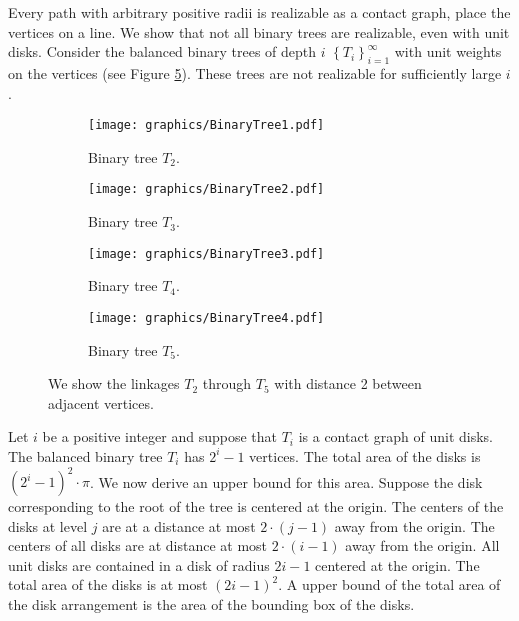 \documentclass[10pt]{CSUNthesis}
\theoremstyle{plain}%
\theoremstyle{definition}
\theoremstyle{remark}
\begin{document}
Every path with arbitrary positive radii is realizable as a contact graph, place the vertices on a line.
We show that not all binary trees are realizable, even with unit disks.%
Consider the balanced binary trees of depth $i$ $\left\lbrace T_i \right\rbrace_{i=1}^\infty$ with unit weights on the vertices (see Figure \ref{fig:circlePacking-1}).
These trees are not realizable for sufficiently large $i$.
\begin{figure}[!htbp]
\begin{center}
  \begin{subfigure}[b]{0.21\textwidth}
	  \texttt{[image: graphics/BinaryTree1.pdf]}
	  \caption{Binary tree $T_2$.}
	  \label{fig:circlePacking1-1}
  \end{subfigure}
  \begin{subfigure}[b]{0.21\textwidth}
	  \texttt{[image: graphics/BinaryTree2.pdf]}
	  \caption{Binary tree $T_3$.}
	  \label{fig:circlePacking1-2}
  \end{subfigure}
  \begin{subfigure}[b]{0.21\textwidth}
	  \texttt{[image: graphics/BinaryTree3.pdf]}
	  \caption{Binary tree $T_4$.}
	  \label{fig:circlePacking1-3}
  \end{subfigure}
  \begin{subfigure}[b]{0.21\textwidth}
	  \texttt{[image: graphics/BinaryTree4.pdf]}
	  \caption{Binary tree $T_5$.}
	  \label{fig:circlePacking1-4}
  \end{subfigure}
  \caption{ We show the linkages $T_2$ through $T_5$ with distance 2 between adjacent vertices.  }\label{fig:circlePacking-1}
\end{center} 
\end{figure}
Let $i$ be a positive integer and suppose that $T_i$ is a contact graph of unit disks.
The balanced binary tree $T_i$ has $2^i -1$ vertices.
The total area of the disks is $\left( 2^i -1 \right)^2 \cdot \pi$.
We now derive an upper bound for this area.
Suppose the disk corresponding to the root of the tree is centered at the origin.
The centers of the disks at level $j$ are at a distance at most $2\cdot (j-1)$ away from the origin.
The centers of all disks are at distance at most $2 \cdot (i -1)$ away from the origin.
All unit disks are contained in a disk of radius $2i-1$ centered at the origin.
The total area of the disks is at most $(2i-1)^2$.  
A upper bound of the total area of the disk arrangement is the area of the bounding box of the disks.
\end{document}
